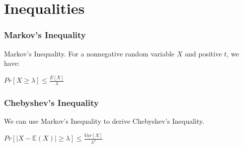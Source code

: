 \section{Inequalities}

\subsubsection{Markov's Inequality}

Markov's Inequality. For a nonnegative random variable $X$ and positive $t$, we have:

$Pr[ X \geq \lambda ] \leq \frac{E[X]}{\lambda}$

\subsubsection{Chebyshev's Inequality}

We can use Markov's Inequality to derive Chebyshev's Inequality. 

$Pr[ |X-\mathbb{E}(X)| \geq \lambda ] \leq \frac{ Var[X] }{\lambda^2}$\\
